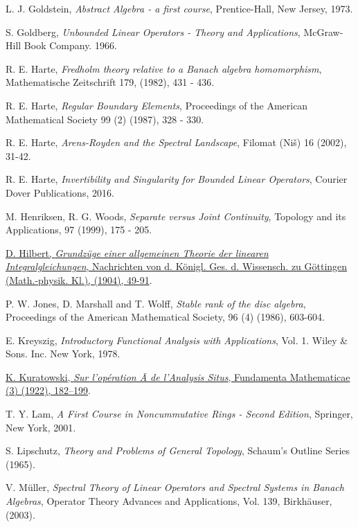 \documentclass[12pt, oneside]{book}
\begin{document}
\begin{thebibliography}{99}
 L. J. Goldstein, \textit{Abstract Algebra - a first course}, Prentice-Hall, New Jersey, 1973.

 S. Goldberg, \textit{Unbounded Linear Operators - Theory and Applications}, McGraw-Hill Book Company. 1966.

 R. E. Harte, \textit{Fredholm theory relative to a Banach algebra homomorphism},
 Mathematische Zeitschrift 179, (1982), 431 - 436.

 R. E. Harte, \textit{Regular Boundary Elements}, Proceedings of the American Mathematical
 Society 99 (2) (1987), 328 - 330.

 R. E. Harte, \textit{Arens-Royden and the Spectral Landscape}, Filomat (Niš) 16 (2002), 31-42.

 R. E. Harte, \textit{Invertibility and Singularity for Bounded Linear Operators}, Courier Dover Publications, 2016.



 M. Henriksen, R. G. Woods, \textit{Separate versus Joint Continuity}, Topology and its Applications, 97 (1999), 175 - 205.

 \href{http://www.digizeitschriften.de/dms/img/?PID=GDZPPN002499967}{D. Hilbert, \textit{Grundzüge einer allgemeinen Theorie der linearen Integralgleichungen}, Nachrichten von d. Königl. Ges. d. Wissensch. zu Göttingen (Math.-physik. Kl.), (1904), 49-91}.

 P. W. Jones, D. Marshall and T. Wolff, \textit{Stable rank of the disc algebra}, Proceedings of the American Mathematical Society, 96 (4) (1986), 603-604.

 E. Kreyszig, \textit{Introductory Functional Analysis with Applications}, Vol. 1. Wiley \& Sons. Inc. New York, 1978.

 \href{http://matwbn.icm.edu.pl/ksiazki/fm/fm3/fm3121.pdf}{K. Kuratowski,  \textit{Sur l'opération Ā de l'Analysis Situs}, Fundamenta Mathematicae (3) (1922), 182–199}.

 T. Y. Lam, \textit{A First Course in Noncummutative Rings - Second Edition}, Springer, New York, 2001.

 S. Lipschutz, \textit{Theory and Problems of General Topology}, Schaum's Outline Series (1965).

 V. M\"{u}ller, \textit{Spectral Theory of Linear Operators and Spectral Systems in 
Banach Algebras}, Operator Theory Advances and Applications, Vol. 139, Birkh\"{a}user, (2003).


\end{thebibliography}
\end{document}
